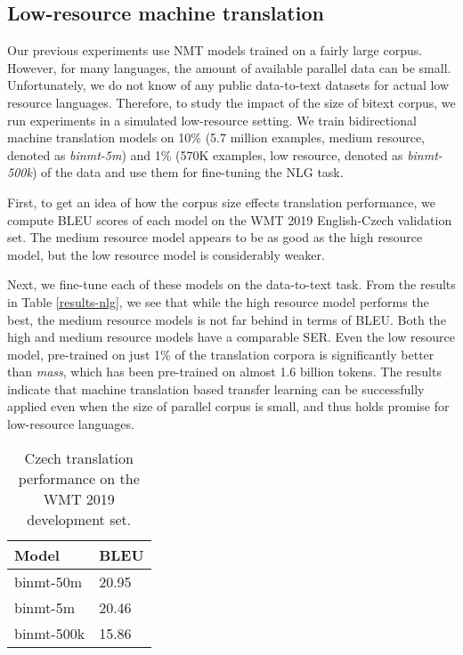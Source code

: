 \documentclass[11pt,a4paper]{article}
\begin{document}
\subsection{Low-resource machine translation} \label{low-nmt}
Our previous experiments use NMT models trained on a fairly large corpus. However, for many languages, the amount of available parallel data can be small. Unfortunately, we do not know of any public data-to-text datasets for actual low resource languages. Therefore, to study the impact of the size of bitext corpus, we run experiments in a simulated low-resource setting. We train bidirectional machine translation models on 10\% (5.7 million examples, medium resource, denoted as \textsl{binmt-5m}) and 1\% (570K examples, low resource, denoted as \textsl{binmt-500k}) of the data and use them for fine-tuning the NLG task.  \par
First, to get an idea of how the corpus size effects translation performance, we compute BLEU  scores of each model on the WMT 2019 English-Czech validation set. The medium resource model appears to be as good as the high resource model, but the low resource model is considerably weaker. \par
Next, we fine-tune each of these models on the data-to-text task. From the results in Table \ref{results-nlg}, we see that while the high resource model performs the best, the medium resource models is not far behind in terms of BLEU. Both the high and medium resource models have a comparable SER. Even the low resource model, pre-trained on just 1\% of the translation corpora is significantly better than \textsl{mass}, which has been pre-trained on almost 1.6 billion tokens. The results indicate that machine translation based transfer learning can be successfully applied even when the size of parallel corpus is small, and thus holds promise for low-resource languages.



\begin{table}[]
\centering
\begin{tabular}{l|l}
\hline
Model & BLEU      \\ \hline
binmt-50m             & 20.95    \\
binmt-5m             & 20.46  \\
binmt-500k             & 15.86 \\ 
\hline

\end{tabular}
\caption{Czech translation performance on the WMT 2019 development set.}
\label{results-nmt}
\end{table}
\end{document}
